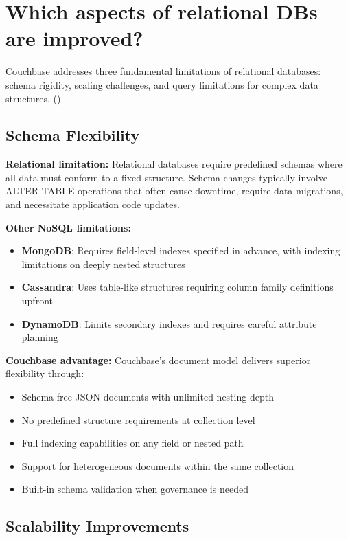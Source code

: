 \chapter{Which aspects of relational DBs are improved?}

Couchbase addresses three fundamental limitations of relational databases: schema rigidity, scaling challenges, and query limitations for complex data structures.
(\cite[p. 16-23]{sadalage2012nosql})
\section{Schema Flexibility}

\textbf{Relational limitation:} Relational databases require predefined schemas where all data must conform to a fixed structure. Schema changes typically involve ALTER TABLE operations that often cause downtime, require data migrations, and necessitate application code updates.


\textbf{Other NoSQL limitations:}
\begin{itemize}
  \item \textbf{MongoDB}: Requires field-level indexes specified in advance, with indexing limitations on deeply nested structures
  \item \textbf{Cassandra}: Uses table-like structures requiring column family definitions upfront
  \item \textbf{DynamoDB}: Limits secondary indexes and requires careful attribute planning
\end{itemize}

\textbf{Couchbase advantage:} Couchbase's document model delivers superior flexibility through:
\begin{itemize}
  \item Schema-free JSON documents with unlimited nesting depth
  \item No predefined structure requirements at collection level
  \item Full indexing capabilities on any field or nested path
  \item Support for heterogeneous documents within the same collection
  \item Built-in schema validation when governance is needed
\end{itemize}

\section{Scalability Improvements}

